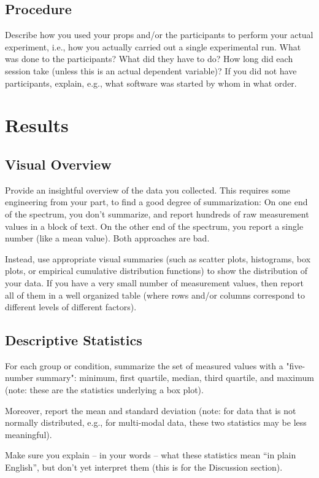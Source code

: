 \documentclass{article}
\begin{document}
\subsection{Procedure}
Describe how you used your props and/or the participants to perform your actual experiment, i.e., how you actually carried out a single experimental run. What was done to the participants? What did they have to do? How long did each session take (unless this is an actual dependent variable)? If you did not have participants, explain, e.g., what software was started by whom in what order.


\section{Results}
\subsection{Visual Overview}
Provide an insightful overview of the data you collected. This requires some engineering from your part, to find a good degree of summarization: On one end of the spectrum, you don't summarize, and report hundreds of raw measurement values in a block of text. On the other end of the spectrum, you report a single number (like a mean value). Both approaches are bad.

Instead, use appropriate visual summaries (such as scatter plots, histograms, box plots, or empirical cumulative distribution functions) to show the distribution of your data. If you have a very small number of measurement values, then report all of them in a well organized table (where rows and/or columns correspond to different levels of different factors).


\subsection{Descriptive Statistics}

For each group or condition, summarize the set of measured values with a "five-number summary": minimum, first quartile, median, third quartile, and maximum (note: these are the statistics underlying a box plot).

Moreover, report the mean and standard deviation (note: for data that is not normally distributed, e.g., for multi-modal data, these two statistics may be less meaningful).

Make sure you explain – in your words – what these statistics mean “in plain English”, but don’t yet interpret them (this is for the Discussion section).
\end{document}
